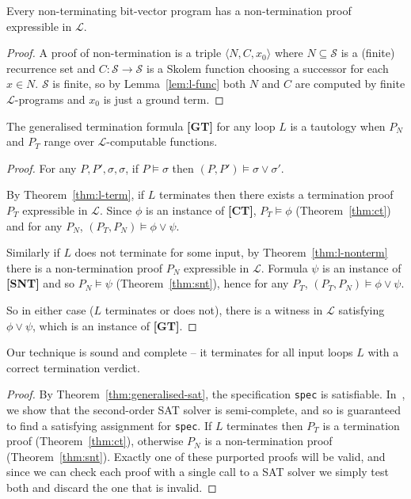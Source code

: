 \documentclass[a4paper]{llncs}
\begin{document}
\begin{theorem}
\label{thm:l-nonterm}
 Every non-terminating bit-vector program has a non-termination proof expressible in $\mathcal{L}$.
\end{theorem}

\begin{proof}
 A proof of non-termination is a triple $\langle N, C, x_0 \rangle$ where
 \mbox{$N \subseteq \mathcal{S}$} is a (finite) recurrence set and
 $C : \mathcal{S} \to \mathcal{S}$ is a Skolem function choosing
 a successor for each $x \in N$.  $\mathcal{S}$ is finite, so by Lemma~\ref{lem:l-func} both
 $N$ and $C$ are computed by finite $\mathcal{L}$-programs and $x_0$ is just a ground term.
\end{proof}

\begin{theorem}
 \label{thm:generalised-sat}
 The generalised termination formula {\bf [GT]} for any loop $L$ is a tautology
 when $P_N$ and $P_T$ range over \mbox{$\mathcal{L}$-computable} functions.
\end{theorem}

\begin{proof}
 For any $P, P', \sigma, \sigma$, if $P \models \sigma$ then $(P, P') \models \sigma \vee \sigma'$.

 By Theorem~\ref{thm:l-term}, if $L$ terminates then there exists a termination proof $P_T$ expressible
 in $\mathcal{L}$.  Since $\phi$ is an instance of {\bf [CT]}, $P_T \models \phi$ (Theorem~\ref{thm:ct}) and
 for any $P_N$, $(P_T, P_N) \models \phi \vee \psi$.

 Similarly if $L$ does not terminate for some input, by Theorem~\ref{thm:l-nonterm} there is a non-termination
 proof $P_N$ expressible in $\mathcal{L}$.  Formula $\psi$ is an instance of {\bf [SNT]} and so $P_N \models \psi$
 (Theorem~\ref{thm:snt}), hence for any $P_T$, $(P_T, P_N) \models \phi \vee \psi$.

 So in either case ($L$ terminates or does not), there is a witness in $\mathcal{L}$ satisfying
 $\phi \vee \psi$, which is an instance of {\bf [GT]}.
\end{proof}

\begin{theorem}
Our technique %
is sound and complete -- it terminates for all input loops $L$ with
 a correct termination verdict.
\end{theorem}

\begin{proof}
 By Theorem~\ref{thm:generalised-sat}, the specification \lstinline!spec! is satisfiable.
 In~\cite{kalashnikov}, we show that the second-order SAT solver is semi-complete, and so is guaranteed to find a satisfying
 assignment for \lstinline!spec!. %
 If $L$ terminates then $P_T$ is a termination proof (Theorem~\ref{thm:ct}),
 otherwise $P_N$ is a non-termination proof (Theorem~\ref{thm:snt}).  Exactly one of these purported proofs
 will be valid, and since we can check each proof with a single call to a SAT solver we simply
 test both and discard the one that is invalid.
\end{proof}
\end{document}
